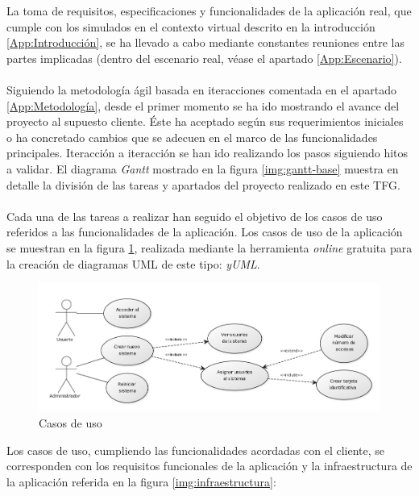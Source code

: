 \documentclass[../PFC.tex]{subfiles}
\begin{document}
La toma de requisitos, especificaciones y funcionalidades de la aplicación real, que cumple con los simulados en el contexto virtual descrito en la introducción \ref{App:Introducción}, se ha llevado a cabo mediante constantes reuniones entre las partes implicadas (dentro del escenario real, véase el apartado \ref{App:Escenario}). 
\\\\
Siguiendo la metodología ágil basada en iteracciones comentada en el apartado \ref{App:Metodología}, desde el primer momento se ha ido mostrando el avance del proyecto al supuesto cliente. Éste ha aceptado según sus requerimientos iniciales o ha concretado cambios que se adecuen en el marco de las funcionalidades principales.  Iteracción a iteracción se han ido realizando los pasos siguiendo hitos a validar. El diagrama \textit{Gantt} mostrado en la figura \ref{img:gantt-base} muestra en detalle la división de las tareas y apartados del proyecto realizado en este TFG.
\\\\
Cada una de las tareas a realizar han seguido el objetivo de los casos de uso referidos a las funcionalidades de la aplicación. Los casos de uso de la aplicación se muestran en la figura \ref{img:usecase1}, realizada mediante la herramienta \textit{online} gratuita para la creación de diagramas UML de este tipo: \textit{yUML}\cite{yUML}.

\begin{figure}[H]
  \centering
  \includegraphics[width=1\textwidth]{./img/usecase1}
  \caption{Casos de uso}
  \label{img:usecase1}
\end{figure}

Los casos de uso, cumpliendo las funcionalidades acordadas con el cliente, se corresponden con los requisitos funcionales de la aplicación y la infraestructura de la aplicación referida en la figura \ref{img:infraestructura}:
\end{document}

